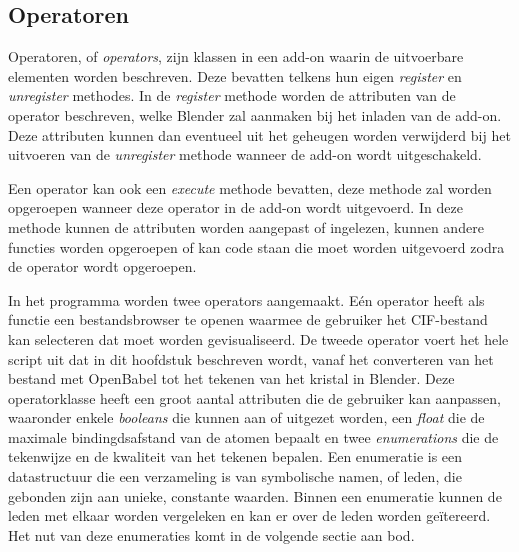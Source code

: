 \subsection{Operatoren}
Operatoren, of \textit{operators}, zijn klassen in een add-on waarin de uitvoerbare elementen worden beschreven. Deze bevatten telkens hun eigen \textit{register} en \textit{unregister} methodes. In de \textit{register} methode worden de attributen van de operator beschreven, welke Blender zal aanmaken bij het inladen van de add-on. Deze attributen kunnen dan eventueel uit het geheugen worden verwijderd bij het uitvoeren van de \textit{unregister} methode wanneer de add-on wordt uitgeschakeld. 
\par
Een operator kan ook een \textit{execute} methode bevatten, deze methode zal worden opgeroepen wanneer deze operator in de add-on wordt uitgevoerd. In deze methode kunnen de attributen worden aangepast of ingelezen, kunnen andere functies worden opgeroepen of kan code staan die moet worden uitgevoerd zodra de operator wordt opgeroepen.
\par
In het programma worden twee operators aangemaakt. Eén operator heeft als functie een bestandsbrowser te openen waarmee de gebruiker het CIF-bestand kan selecteren dat moet worden gevisualiseerd. De tweede operator voert het hele script uit dat in dit hoofdstuk beschreven wordt, vanaf het converteren van het bestand met OpenBabel tot het tekenen van het kristal in Blender. Deze operatorklasse heeft een groot aantal attributen die de gebruiker kan aanpassen, waaronder enkele \textit{booleans} die kunnen aan of uitgezet worden, een \textit{float} die de maximale bindingdsafstand van de atomen bepaalt en twee \textit{enumerations} die de tekenwijze en de kwaliteit van het tekenen bepalen. Een enumeratie is een datastructuur die een verzameling is van symbolische namen, of leden, die gebonden zijn aan unieke, constante waarden. Binnen een enumeratie kunnen de leden met elkaar worden vergeleken en kan er over de leden worden geïtereerd.\citep*{ENUM} Het nut van deze enumeraties komt in de volgende sectie aan bod.


